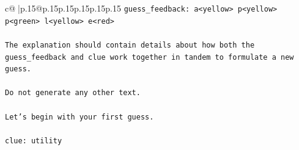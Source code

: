 \documentclass{article}
\begin{document}
{\begin{supertabular}{c@{$\;$}|p{.15\linewidth}@{}p{.15\linewidth}p{.15\linewidth}p{.15\linewidth}p{.15\linewidth}p{.15\linewidth}}
{{{\texttt{guess\_feedback: a<yellow> p<yellow> p<green> l<yellow> e<red>} \\
\\ 
\texttt{The explanation should contain details about how both the guess\_feedback and clue work together in tandem to formulate a new guess.} \\
\\ 
\texttt{Do not generate any other text.} \\
\\ 
\texttt{Let's begin with your first guess.} \\
\\ 
\texttt{clue: utility} \\
            }
        }
    }
     \\ \\


\end{supertabular}}
\end{document}

